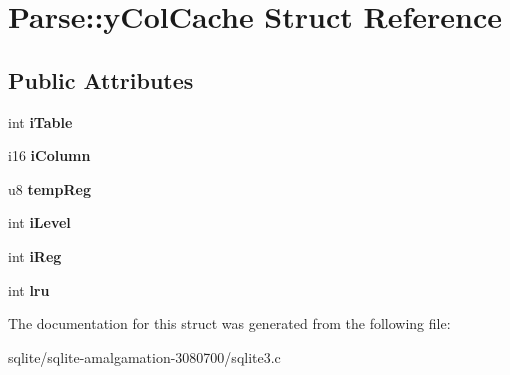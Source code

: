 \hypertarget{struct_parse_1_1y_col_cache}{\section{Parse\+:\+:y\+Col\+Cache Struct Reference}
\label{struct_parse_1_1y_col_cache}
}
\subsection*{Public Attributes}
\begin{DoxyCompactItemize}
\item 
\hypertarget{struct_parse_1_1y_col_cache_a7d99a4e00555cb0ff7fb3990bb7b549e}{int {\bfseries i\+Table}}\label{struct_parse_1_1y_col_cache_a7d99a4e00555cb0ff7fb3990bb7b549e}

\item 
\hypertarget{struct_parse_1_1y_col_cache_a61384f3e70790b1e3058eae8b893fbb9}{i16 {\bfseries i\+Column}}\label{struct_parse_1_1y_col_cache_a61384f3e70790b1e3058eae8b893fbb9}

\item 
\hypertarget{struct_parse_1_1y_col_cache_a61561cab1ce2e1914083777ae84c8fe8}{u8 {\bfseries temp\+Reg}}\label{struct_parse_1_1y_col_cache_a61561cab1ce2e1914083777ae84c8fe8}

\item 
\hypertarget{struct_parse_1_1y_col_cache_a656ea77cf538db00249221de58fd9066}{int {\bfseries i\+Level}}\label{struct_parse_1_1y_col_cache_a656ea77cf538db00249221de58fd9066}

\item 
\hypertarget{struct_parse_1_1y_col_cache_aadb47e545234142bd1e9ca4803953ab0}{int {\bfseries i\+Reg}}\label{struct_parse_1_1y_col_cache_aadb47e545234142bd1e9ca4803953ab0}

\item 
\hypertarget{struct_parse_1_1y_col_cache_ac163bb2b692f3037054f92294322f999}{int {\bfseries lru}}\label{struct_parse_1_1y_col_cache_ac163bb2b692f3037054f92294322f999}

\end{DoxyCompactItemize}


The documentation for this struct was generated from the following file\+:\begin{DoxyCompactItemize}
\item 
sqlite/sqlite-\/amalgamation-\/3080700/sqlite3.\+c\end{DoxyCompactItemize}
